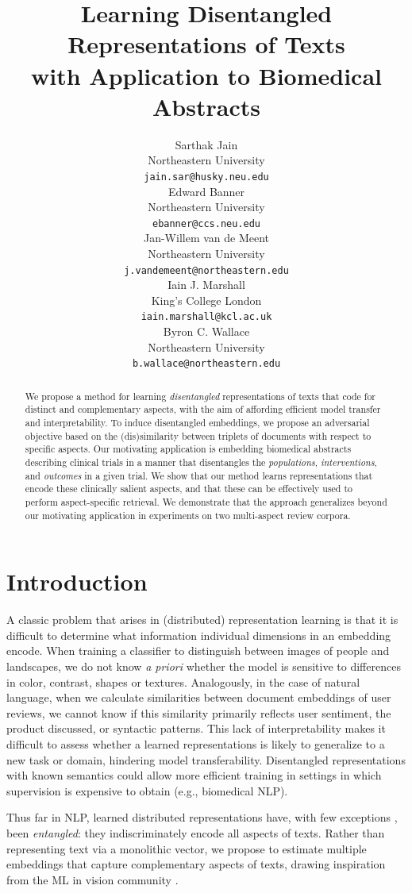 \documentclass[11pt,a4paper]{article}
\title{Learning Disentangled Representations of Texts \\ with Application to Biomedical Abstracts}
\author{Sarthak Jain \\
  Northeastern University \\
  {\tt \small jain.sar@husky.neu.edu} \\\And
  Edward Banner \\
  Northeastern University \\
  {\tt \small ebanner@ccs.neu.edu} \\\And
  Jan-Willem van de Meent \\
  Northeastern University \\
  {\tt \small j.vandemeent@northeastern.edu} \\\AND
  Iain J. Marshall \\
  King's College London \\
  {\tt \small iain.marshall@kcl.ac.uk} \\\And
  Byron C. Wallace \\
  Northeastern University \\
  {\tt \small b.wallace@northeastern.edu}
  }
\date{}
\begin{document}
\maketitle
\begin{abstract}

We propose a method for learning \emph{disentangled} representations of texts that code for distinct and complementary aspects, with the aim of affording efficient model transfer and interpretability. To induce disentangled embeddings, we propose an adversarial objective based on the (dis)similarity between triplets of documents with respect to specific aspects. Our motivating application is embedding biomedical abstracts describing clinical trials in a manner that disentangles the \emph{populations}, \emph{interventions}, and \emph{outcomes} in a given trial. We show that our method learns representations that encode these clinically salient aspects, and that these can be effectively used to perform aspect-specific retrieval. We demonstrate that the approach generalizes beyond our motivating application in experiments on two multi-aspect review corpora. 
\end{abstract}

\section{Introduction}
\vspace{-.25em}

A classic problem that arises in (distributed) representation learning is that it is difficult to determine what information individual dimensions in an embedding encode. When training a classifier to distinguish between images of people and landscapes, we do not know \emph{a priori} whether the model is sensitive to differences in color, contrast, shapes or textures. Analogously, in the case of natural language, when we calculate similarities between document embeddings of user reviews, we cannot know if this similarity primarily reflects user sentiment, the product discussed, or syntactic patterns. This lack of interpretability 
makes it difficult to assess whether a learned representations is likely to generalize to a new task or domain, hindering model transferability. Disentangled representations with known semantics could allow more efficient training in settings in which supervision is expensive to obtain (e.g., biomedical NLP).

Thus far in NLP, learned distributed representations have, with few exceptions \cite{ruder2016hierarchical,he-2017,zhang2017aspect}, been \emph{entangled}: they indiscriminately encode all aspects of texts. 
Rather than representing text via a monolithic vector, we propose to estimate multiple embeddings that capture complementary aspects of texts, drawing inspiration from the ML in vision community \cite{whitney2016disentangled,veit2017conditional}.
\end{document}
